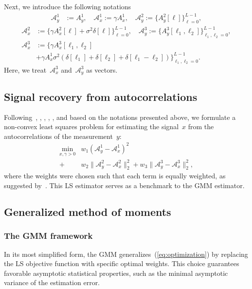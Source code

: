 \documentclass{article}
\newcommand{\A}[0]{\mathcal{A}}
\begin{document}
Next, we introduce the following notations
\begin{align}
\A_y^1 &:= A_y^1, \quad \A_x^1 := \gamma A_x^1, \nonumber\quad
	 \A_y^2 := \Big\{A_y^2[\ell]\Big\}_{\ell=0}^{L-1},\nonumber
\end{align}
\begin{align}
	\A_x^2 &:= \Big\{\gamma A_x^2[\ell]+ \sigma^2 \delta[\ell]\Big\}_{\ell=0}^{L-1},\nonumber\quad
	\A_y^3 := \Big\{A_y^3[\ell_1, \ell_2]\Big\}_{\ell_1,\ell_2=0}^{L-1},\nonumber \\
	\A_x^3 &:= \Big\{\gamma A_x^3[\ell_1, \ell_2] \nonumber\\&+ \gamma A_{x}^1 \sigma^2 (\delta[\ell_1] + \delta[\ell_2] + \delta[\ell_1 - \ell_2])\Big\}_{\ell_1,\ell_2=0}^{L-1}. \nonumber
\end{align}
Here, we treat~$\A_x^3$ and~$\A_y^3$ as vectors.
\subsection{Signal recovery from autocorrelations}
Following~\cite{bendory2019multi}, \cite{lan2020multi}, \cite{marshall2020image}, \cite{bendory2021multi}, \cite{kreymer2021two}, and based on the notations presented above, we formulate a non-convex least squares problem for estimating the signal~$x$ from the autocorrelations of the measurement~$y$:
\begin{align}
\label{eq:optimization}
\min_{x, \gamma > 0} &w_1 (\A_y^1 - \A_x^1)^2 \nonumber\\ +& w_2 \|\A_y^2 - \A_x^2\|_2^2 + w_3 \|\A_y^3 - \A_x^3\|_2^2,
\end{align}
where the weights were chosen such that each term is equally weighted, as suggested by~\cite{bendory2019multi}. This LS estimator serves as a benchmark to the GMM estimator. %

\subsection{Generalized method of moments}
\label{gmm}
\subsubsection{The GMM framework}\label{gmm:framwork}
In its most simplified form, the GMM generalizes~(\ref{eq:optimization}) by replacing the LS objective function with specific optimal weights. This choice guarantees favorable asymptotic statistical properties, such as {the} minimal asymptotic variance of the estimation error.
\end{document}
